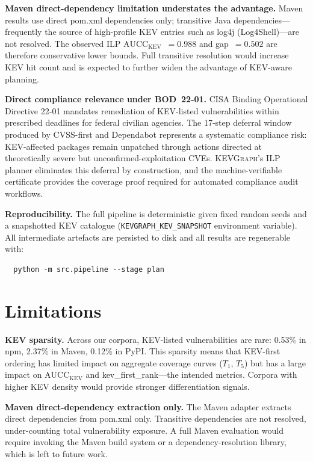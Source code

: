 \documentclass[conference]{IEEEtran}
\newcommand{\kevgraph}{\textsc{KEVGraph}\xspace}
\newcommand{\aucc}{$\mathrm{AUCC}_{\mathrm{KEV}}$\xspace}
\newcommand{\Tone}{$T_1$\xspace}
\newcommand{\Tfive}{$T_5$\xspace}
\begin{document}
\textbf{Maven direct-dependency limitation understates the advantage.}
Maven results use direct pom.xml dependencies only; transitive Java
dependencies---frequently the source of high-profile KEV entries such
as log4j (Log4Shell)---are not resolved.  The observed
ILP \aucc~$= 0.988$ and gap~$= 0.502$ are therefore conservative
lower bounds.  Full transitive resolution would increase KEV hit count
and is expected to further widen the advantage of KEV-aware planning.

\textbf{Direct compliance relevance under BOD~22-01.}
CISA Binding Operational Directive 22-01 mandates remediation of
KEV-listed vulnerabilities within prescribed deadlines for federal
civilian agencies.  The 17-step deferral window produced by CVSS-first
and Dependabot represents a systematic compliance risk: KEV-affected
packages remain unpatched through actions directed at theoretically
severe but unconfirmed-exploitation CVEs.  \kevgraph's ILP planner
eliminates this deferral by construction, and the machine-verifiable
certificate provides the coverage proof required for automated
compliance audit workflows.

\textbf{Reproducibility.}
The full pipeline is deterministic given fixed random seeds and a
snapshotted KEV catalogue (\texttt{KEVGRAPH\_KEV\_SNAPSHOT}
environment variable).  All intermediate artefacts are persisted to
disk and all results are regenerable with:
\begin{verbatim}
  python -m src.pipeline --stage plan
\end{verbatim}

\section{Limitations}
\label{sec:limitations}

\textbf{KEV sparsity.}  Across our corpora, KEV-listed vulnerabilities
are rare: 0.53\% in npm, 2.37\% in Maven, 0.12\% in PyPI.
This sparsity means that KEV-first ordering has limited impact on
aggregate coverage curves (\Tone, \Tfive) but has a large impact on
\aucc and kev\_first\_rank---the intended metrics.  Corpora with
higher KEV density would provide stronger differentiation signals.

\textbf{Maven direct-dependency extraction only.}  The Maven adapter
extracts direct dependencies from pom.xml only.  Transitive
dependencies are not resolved, under-counting total vulnerability
exposure.  A full Maven evaluation would require invoking the Maven
build system or a dependency-resolution library, which is left to
future work.
\end{document}
